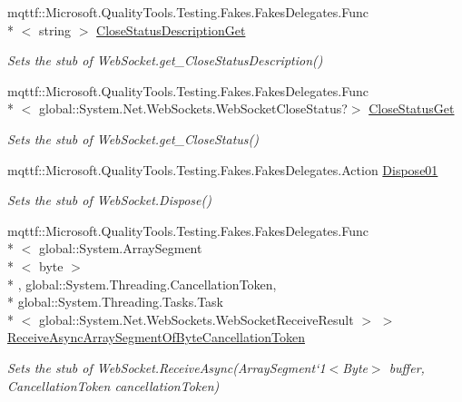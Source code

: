 \begin{DoxyCompactItemize}
mqttf\-::\-Microsoft.\-Quality\-Tools.\-Testing.\-Fakes.\-Fakes\-Delegates.\-Func\\*
$<$ string $>$ \hyperlink{class_system_1_1_net_1_1_web_sockets_1_1_fakes_1_1_stub_web_socket_a741f1454527230b47fd65143ae600061}{Close\-Status\-Description\-Get}
\begin{DoxyCompactList}\small\item\em Sets the stub of Web\-Socket.\-get\-\_\-\-Close\-Status\-Description()\end{DoxyCompactList}\item 
mqttf\-::\-Microsoft.\-Quality\-Tools.\-Testing.\-Fakes.\-Fakes\-Delegates.\-Func\\*
$<$ global\-::\-System.\-Net.\-Web\-Sockets.\-Web\-Socket\-Close\-Status?$>$ \hyperlink{class_system_1_1_net_1_1_web_sockets_1_1_fakes_1_1_stub_web_socket_a04a60f3ef959b863720ffb5d7ccdb0a6}{Close\-Status\-Get}
\begin{DoxyCompactList}\small\item\em Sets the stub of Web\-Socket.\-get\-\_\-\-Close\-Status()\end{DoxyCompactList}\item 
mqttf\-::\-Microsoft.\-Quality\-Tools.\-Testing.\-Fakes.\-Fakes\-Delegates.\-Action \hyperlink{class_system_1_1_net_1_1_web_sockets_1_1_fakes_1_1_stub_web_socket_a172d6ef96a892cb46f53f506d4d89f1c}{Dispose01}
\begin{DoxyCompactList}\small\item\em Sets the stub of Web\-Socket.\-Dispose()\end{DoxyCompactList}\item 
mqttf\-::\-Microsoft.\-Quality\-Tools.\-Testing.\-Fakes.\-Fakes\-Delegates.\-Func\\*
$<$ global\-::\-System.\-Array\-Segment\\*
$<$ byte $>$\\*
, global\-::\-System.\-Threading.\-Cancellation\-Token, \\*
global\-::\-System.\-Threading.\-Tasks.\-Task\\*
$<$ global\-::\-System.\-Net.\-Web\-Sockets.\-Web\-Socket\-Receive\-Result $>$ $>$ \hyperlink{class_system_1_1_net_1_1_web_sockets_1_1_fakes_1_1_stub_web_socket_a555f1608ea2863b7db11c29a3842883a}{Receive\-Async\-Array\-Segment\-Of\-Byte\-Cancellation\-Token}
\begin{DoxyCompactList}\small\item\em Sets the stub of Web\-Socket.\-Receive\-Async(Array\-Segment`1$<$Byte$>$ buffer, Cancellation\-Token cancellation\-Token)\end{DoxyCompactList}\item 

\end{DoxyCompactItemize}
